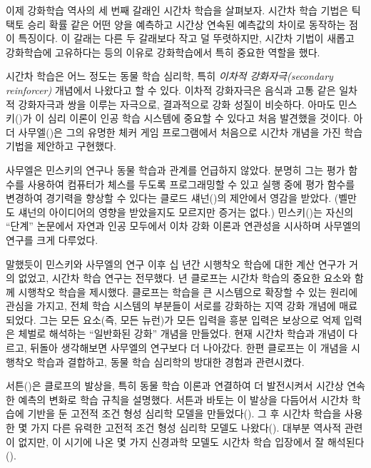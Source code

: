 이제 강화학습 역사의 세 번째 갈래인 시간차 학습을 살펴보자. 시간차 학습 기법은
틱택토 승리 확률 같은 어떤 양을 예측하고 시간상 연속된 예측값의 차이로 동작하는
점이 특징이다. 이 갈래는 다른 두 갈래보다 작고 덜 뚜렷하지만, 시간차 기법이
새롭고 강화학습에 고유하다는 등의 이유로 강화학습에서 특히 중요한 역할을 했다.

시간차 학습은 어느 정도는 동물 학습 심리학, 특히 \emph{이차적 강화자극(secondary
reinforcer)} 개념에서 나왔다고 할 수 있다. 이차적 강화자극은 음식과 고통 같은
일차적 강화자극과 쌍을 이루는 자극으로, 결과적으로 강화 성질이 비슷하다. 아마도
민스키(\cite*{Minsky1954})가 이 심리 이론이 인공 학습 시스템에 중요할 수 있다고
처음 발견했을 것이다. 아더 사무엘(\cite{Samuel1959})은 그의 유명한 체커 게임
프로그램에서 처음으로 시간차 개념을 가진 학습 기법을 제안하고 구현했다.

사무엘은 민스키의 연구나 동물 학습과 관계를 언급하지 않았다. 분명히 그는 평가
함수를 사용하여 컴퓨터가 체스를 두도록 프로그래밍할 수 있고 실행 중에 평가
함수를 변경하여 경기력을 향상할 수 있다는 클로드 섀넌(\cite*{Shannon1950})의
제안에서 영감을 받았다. (벨만도 섀넌의 아이디어의 영향을 받았을지도 모르지만
증거는 없다.) 민스키(\cite*{Minsky1961})는 자신의 ``단계'' 논문에서 자연과 인공
모두에서 이차 강화 이론과 연관성을 시사하며 사무엘의 연구를 크게 다루었다.


말했듯이 민스키와 사무엘의 연구 이후 십 년간 시행착오 학습에 대한 계산 연구가
거의 없었고, 시간차 학습 연구는 전무했다. \cite*{Klopf1972}년 클로프는 시간차
학습의 중요한 요소와 함께 시행착오 학습을 제시했다. 클로프는 학습을 큰
시스템으로 확장할 수 있는 원리에 관심을 가지고, 전체 학습 시스템의 부분들이
서로를 강화하는 지역 강화 개념에 매료되었다. 그는 모든 요소(즉, 모든 뉴런)가
모든 입력을 흥분 입력은 보상으로 억제 입력은 체벌로 해석하는 ``일반화된 강화''
개념을 만들었다. 현재 시간차 학습과 개념이 다르고, 뒤돌아 생각해보면 사무엘의
연구보다 더 나아갔다. 한편 클로프는 이 개념을 시행착오 학습과 결합하고, 동물
학습 심리학의 방대한 경험과 관련시켰다.

서튼(\cite*{Sutton1978a, Sutton1978b, Sutton1978c})은 클로프의 발상을, 특히 동물
학습 이론과 연결하여 더 발전시켜서 시간상 연속한 예측의 변화로 학습 규칙을
설명했다. 서튼과 바토는 이 발상을 다듬어서 시간차 학습에 기반을 둔 고전적 조건
형성 심리학 모델을 만들었다(\cite{SuttonBarto1981a, BartoSutton1982}). 그 후
시간차 학습을 사용한 몇 가지 다른 유력한 고전적 조건 형성 심리학 모델도
나왔다(\cite{Klopf1988, MooreEt1986, SuttonBarto1987, SuttonBarto1990}). 대부분
역사적 관련이 없지만, 이 시기에 나온 몇 가지 신경과학 모델도 시간차 학습
입장에서 잘 해석된다(\cite{HawkinsKandel1984, ByrneGingrichBaxter1990,
GelperinHopfieldTank1985, Tesauro1986, FristonEt1994}).

